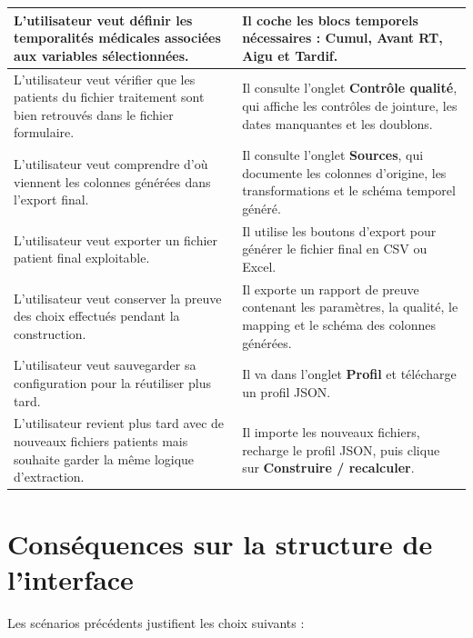 \documentclass[11pt,a4paper]{article}
\begin{document}
\begin{longtable}{|p{}|p{}|}
L'utilisateur veut définir les temporalités médicales associées aux variables sélectionnées.
&
Il coche les blocs temporels nécessaires : \textbf{Cumul}, \textbf{Avant RT}, \textbf{Aigu} et \textbf{Tardif}.
\\
\hline

L'utilisateur veut vérifier que les patients du fichier traitement sont bien retrouvés dans le fichier formulaire.
&
Il consulte l'onglet \textbf{Contrôle qualité}, qui affiche les contrôles de jointure, les dates manquantes et les doublons.
\\
\hline

L'utilisateur veut comprendre d'où viennent les colonnes générées dans l'export final.
&
Il consulte l'onglet \textbf{Sources}, qui documente les colonnes d'origine, les transformations et le schéma temporel généré.
\\
\hline

L'utilisateur veut exporter un fichier patient final exploitable.
&
Il utilise les boutons d'export pour générer le fichier final en CSV ou Excel.
\\
\hline

L'utilisateur veut conserver la preuve des choix effectués pendant la construction.
&
Il exporte un rapport de preuve contenant les paramètres, la qualité, le mapping et le schéma des colonnes générées.
\\
\hline

L'utilisateur veut sauvegarder sa configuration pour la réutiliser plus tard.
&
Il va dans l'onglet \textbf{Profil} et télécharge un profil JSON.
\\
\hline

L'utilisateur revient plus tard avec de nouveaux fichiers patients mais souhaite garder la même logique d'extraction.
&
Il importe les nouveaux fichiers, recharge le profil JSON, puis clique sur \textbf{Construire / recalculer}.
\\
\hline

\end{longtable}

\section{Conséquences sur la structure de l'interface}

Les scénarios précédents justifient les choix suivants :
\end{document}
